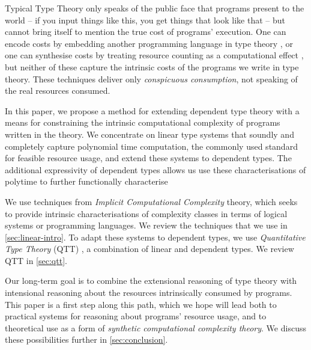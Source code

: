 \documentclass[acmsmall,review,screen,anonymous]{acmart}
\begin{document}
Typical Type Theory only speaks of the public face that programs
present to the world -- if you input things like this, you get things
that look like that -- but cannot bring itself to mention the true
cost of programs' execution. One can encode costs by embedding another
programming language in type theory \cite{pottier}, or one can
synthesise costs by treating resource counting as a computational
effect \cite{daniellsson,calf}, but neither of these capture the
intrinsic costs of the programs we write in type theory. These
techniques deliver only \emph{conspicuous consumption}, not speaking
of the real resources consumed.

In this paper, we propose a method for extending dependent type theory
with a means for constraining the intrinsic computational complexity
of programs written in the theory. We concentrate on linear type
systems that soundly and completely capture polynomial time
computation, the commonly used standard for feasible resource usage,
and extend these systems to dependent types. The additional
expressivity of dependent types allows us use these characterisations
of polytime to further functionally characterise

We use techniques from \emph{Implicit Computational Complexity}
theory, which seeks to provide intrinsic characterisations of
complexity classes in terms of logical systems or programming
languages. We review the techniques that we use in
\autoref{sec:linear-intro}. To adapt these systems to dependent types,
we use \emph{Quantitative Type Theory} (QTT)
\cite{atkey18qtt,mcbride16}, a combination of linear and dependent
types. We review QTT in \autoref{sec:qtt}.

Our long-term goal is to combine the extensional reasoning of type
theory with intensional reasoning about the resources intrinsically
consumed by programs. This paper is a first step along this path,
which we hope will lead both to practical systems for reasoning about
programs' resource usage, and to theoretical use as a form of
\emph{synthetic computational complexity theory}. We discuss these
possibilities further in \autoref{sec:conclusion}.


\end{document}
